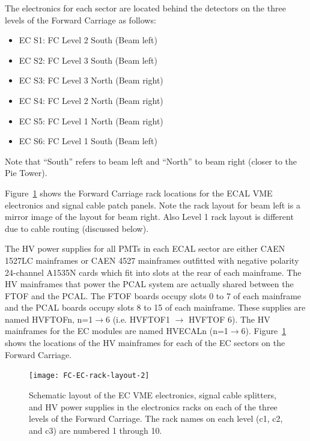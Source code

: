 \documentclass[letterpaper,10pt]{article}
\begin{document}
The electronics for each sector are located behind the detectors on the three levels of the Forward 
Carriage as follows:

\vskip 0.5cm

\begin{minipage}{0.5\textwidth}
\begin{itemize}
\item EC S1: FC Level 2 South (Beam left)
\item EC S2: FC Level 3 South (Beam left)
\item EC S3: FC Level 3 North (Beam right)
\end{itemize}
\end{minipage}
\begin{minipage}{0.5\textwidth}
\begin{itemize}
\item EC S4: FC Level 2 North (Beam right)
\item EC S5: FC Level 1 North (Beam right)
\item EC S6: FC Level 1 South (Beam left)
\end{itemize}
\end{minipage}

\vskip 0.5cm

Note that ``South'' refers to beam left and ``North'' to beam right (closer to the Pie Tower).

Figure~\ref{fc-layout-1} shows the Forward Carriage rack locations for the ECAL VME electronics and signal cable patch 
panels.  Note the rack layout for beam left is a mirror image of the layout for beam right.  Also Level 1 rack layout
is different due to cable routing (discussed below).

The HV power supplies for all PMTs in each ECAL sector are either CAEN 1527LC mainframes or CAEN 4527 mainframes 
outfitted with negative polarity 24-channel A1535N cards which fit into slots at the rear of each
mainframe. The HV mainframes that power the PCAL 
system are actually shared between the FTOF and the PCAL. The FTOF boards occupy slots 0 to 7 of each 
mainframe and the PCAL boards occupy slots 8 to 15 of each mainframe. These supplies are named HVFTOFn, 
n=1$\to$6 (i.e. HVFTOF1 $\to$ HVFTOF 6). The HV mainframes for the EC modules are named HVECALn (n=1$\to$6).
Figure~\ref{fc-layout-1} shows the locations of the HV mainframes for each of the EC sectors on the Forward Carriage.

\begin{figure}[htbp]
  \centering
  \texttt{[image: FC-EC-rack-layout-2]}
  \vspace{2mm}
  \caption{Schematic layout of the EC VME electronics, signal cable splitters, and HV power 
  supplies in the electronics racks on each of the three levels of the Forward Carriage. The rack names on each level (c1, c2,
  and c3) are numbered 1 through 10.}
  \label{fc-layout-1} 
\end{figure}
\end{document}
